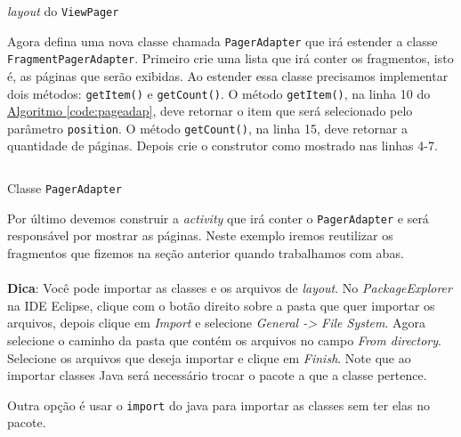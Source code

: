\documentclass[a4paper,12pt,brazil,oneside]{book}
\begin{document}
	\begin{listing}[H]
	\inputminted[linenos=true,fontsize=\small,frame=lines, framesep=2mm, tabsize=2,numbersep=5pt]{xml}{src/design/viewpager.xml}
	\caption{\emph{layout} do \texttt{ViewPager}}
	\end{listing}
	
	Agora defina uma nova classe chamada \texttt{PagerAdapter} que irá estender a classe \\ \texttt{FragmentPagerAdapter}. Primeiro crie uma lista que irá conter os fragmentos, isto é, as páginas que serão exibidas. Ao estender essa classe precisamos implementar dois métodos: \texttt{getItem()} e \texttt{getCount()}. O método \texttt{getItem()}, na linha 10 do \hyperref[code:pageadap]{Algoritmo \ref*{code:pageadap}}, deve retornar o item que será selecionado pelo parâmetro \texttt{position}. O método \texttt{getCount()}, na linha 15, deve retornar a quantidade de páginas. Depois crie o construtor como mostrado nas linhas 4-7. 

	\begin{listing}[H]
	\inputminted[linenos=true,fontsize=\small,frame=lines, framesep=2mm, tabsize=2,numbersep=5pt]{java}{src/design/pageradapter.java}
	\caption{Classe \texttt{PagerAdapter}}
	\label{code:pageadap}
	\end{listing}
	
	Por último devemos construir a \emph{activity} que irá conter o \texttt{PagerAdapter} e será responsável por mostrar as páginas. Neste exemplo iremos reutilizar os fragmentos que fizemos na seção anterior quando trabalhamos com abas.
	
	\begin{framed}
	\paragraph{}\textbf{Dica}: Você pode importar as classes e os arquivos de \emph{layout}. No \emph{PackageExplorer} na IDE Eclipse, clique com o botão direito sobre a pasta que quer importar os arquivos, depois clique em \emph{Import} e selecione \emph{General -> File System}. Agora selecione o caminho da pasta que contém os arquivos no campo \emph{From directory}. Selecione os arquivos que deseja importar e clique em \emph{Finish}.
	Note que ao importar classes Java será necessário trocar o pacote a que a classe pertence.
	
	Outra opção é usar o \texttt{import} do java para importar as classes sem ter elas no pacote.
	
	\textit{}
	\end{framed}
\end{document}
